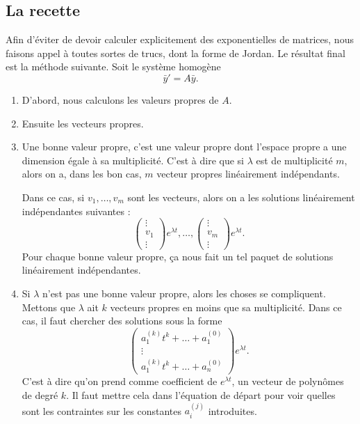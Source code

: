 					\subsection{La recette}

Afin d'éviter de devoir calculer explicitement des exponentielles de matrices, nous faisons appel à toutes sortes de trucs, dont la forme de Jordan. Le résultat final est la méthode suivante. Soit le système homogène
\begin{equation}
	\bar y'=A\bar y.
\end{equation}

\let\oldTheEnumi\theenumi
\renewcommand{\theenumi}{\arabic{enumi}}
\begin{enumerate}

\item 
D'abord, nous calculons les valeurs propres de $A$.

\item
Ensuite les vecteurs propres.

\item\label{ItemRapSystDc}
Une bonne valeur propre, c'est une valeur propre dont l'espace propre a une dimension égale à sa multiplicité. C'est à dire que si $\lambda$ est de multiplicité $m$, alors on a, dans les bon cas,  $m$ vecteur propres linéairement indépendants.

Dans ce cas, si $v_1,\ldots,v_m$ sont les vecteurs, alors on a les solutions linéairement indépendantes suivantes :
\begin{equation}
	\begin{pmatrix}
	\vdots	\\ 
	v_1	\\ 
		\vdots	
\end{pmatrix} e^{\lambda t},\ldots,
\begin{pmatrix}
	\vdots		\\ 
	v_m	\\ 
	\vdots		
\end{pmatrix} e^{\lambda t}.
\end{equation}
Pour chaque bonne valeur propre, ça nous fait un tel paquet de solutions linéairement indépendantes.

\item
Si $\lambda$ n'est pas une bonne valeur propre, alors les choses se compliquent. Mettons que $\lambda$ ait $k$ vecteurs propres en moins que sa multiplicité. Dans ce cas, il faut chercher des solutions sous la forme
\begin{equation}		\label{EqEqRapAsTestPolk}
	 \begin{pmatrix}
	a^{(k)}_1t^k+\ldots+a_1^{(0)}	\\ 
	\vdots	\\ 
	a^{(k)}_1t^k+\ldots+a_n^{(0)}		
\end{pmatrix} e^{\lambda t}.
\end{equation}
C'est à dire qu'on prend comme coefficient de $ e^{\lambda t}$, un vecteur de polynômes de degré $k$. Il faut mettre cela dans l'équation de départ pour voir quelles sont les contraintes sur les constantes $a_i^{(j)}$ introduites.


\end{enumerate}
